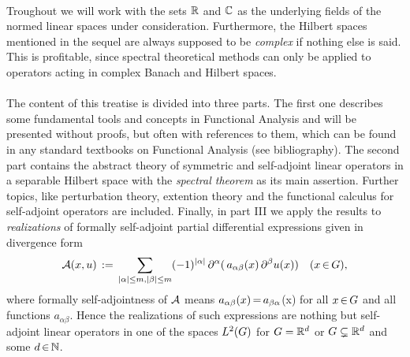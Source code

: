\documentclass[11pt,twoside]{article}
\begin{document}
\paragraph{}
Troughout we will work with the sets ${\mathbb{R}}$ and ${\mathbb{C}}$ as the underlying fields
of the normed linear spaces under consideration.
Furthermore,
the Hilbert spaces mentioned in the sequel are always supposed to be
\textit{complex} if nothing else is said.
This is profitable,
since spectral theoretical methods can only be applied
to operators acting in complex Banach and Hilbert spaces.

\paragraph{}
The content of this treatise is divided into three parts.
The first one describes some fundamental tools and concepts
in Functional Analysis and will be presented without proofs,
but often with references to them,
which can be found in any standard textbooks on Functional Analysis
(see bibliography).
The second part contains the abstract theory of symmetric and self-adjoint
linear operators in a separable Hilbert space
with the \textit{spectral theorem} as its main assertion.
Further topics,
like perturbation theory, extention theory and the functional calculus
for self-adjoint operators are included.
Finally,
in part III we apply the results to \textit{realizations}
of formally self-adjoint partial differential expressions
given in divergence form
\[
\DO(x,u) \eqdef
\sum_{\abs{\alpha} \leq m, \abs{\beta} \leq m} (-1)^{\abs{\alpha} } \,
\partial^{\alpha}(\,a_{\alpha \beta}(x) \, \partial^{\beta} u(x))
\quad (x \xeof \G),
\]
where formally self-adjointness of ${\mathcal{A}}$ means
$a_{\alpha \beta}(x) {\,=\,} a_{\beta \alpha}$(x) for all $x {\,\in\,} G$ and
all functions $a_{\alpha \beta}$.
Hence the realizations of such expressions 
are nothing but self-adjoint linear operators
in one of the spaces $L^2(G)$ for $G={\mathbb{R}}^d$ or $G \subsetneq {\mathbb{R}}^d$
and some $d {\,\in\,} {\mathbb{N}}$.
\end{document}
